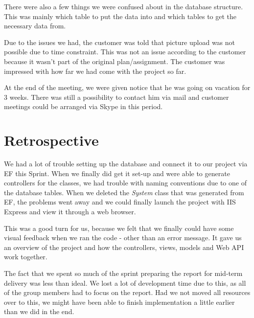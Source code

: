 There were also a few things we were confused about in the database structure. This was mainly which table to put the data into and which tables to get the necessary data from.

Due to the issues we had, the customer was told that picture upload was not possible due to time constraint. This was not an issue according to the customer because it wasn't part of the original plan/assignment. The customer was impressed with how far we had come with the project so far.

At the end of the meeting, we were given notice that he was going on vacation for 3 weeks. There was still a possibility to contact him via mail and customer meetings could be arranged via Skype in this period.

\section{Retrospective}
We had a lot of trouble setting up the database and connect it to our project via EF this Sprint. When we finally did get it set-up and were able to generate controllers for the classes, we had trouble with naming conventions due to one of the database tables. When we deleted the \emph{System} class that was generated from EF, the problems went away and we could finally launch the project with IIS Express and view it through a web browser.

This was a good turn for us, because we felt that we finally could have some visual feedback when we ran the code - other than an error message. It gave us an overview of the project and how the controllers, views, models and Web API work together.

The fact that we spent so much of the sprint preparing the report for mid-term delivery was less than ideal. We lost a lot of development time due to this, as all of the group members had to focus on the report. Had we not moved all resources over to this, we might have been able to finish implementation a little earlier than we did in the end.